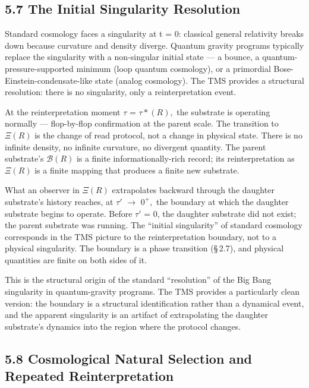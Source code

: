 \documentclass[11pt,oneside]{report}
\theoremstyle{definition}
\theoremstyle{remark}
\begin{document}
\subsection*{5.7 The Initial Singularity Resolution}

Standard cosmology faces a singularity at t = 0: classical general
relativity breaks down because curvature and density diverge. Quantum
gravity programs typically replace the singularity with a non-singular
initial state --- a bounce, a quantum-pressure-supported minimum (loop
quantum cosmology), or a primordial Bose-Einstein-condensate-like state
(analog cosmology). The TMS provides a structural resolution: there is
no singularity, only a reinterpretation event.

At the reinterpretation moment \ensuremath{\tau} = \ensuremath{\tau *(R),} the substrate is operating
normally --- flop-by-flop confirmation at the parent scale. The
transition to \ensuremath{\Xi (R)} is the change of read protocol, not a change in
physical state. There is no infinite density, no infinite curvature, no
divergent quantity. The parent substrate's \ensuremath{\mathcal{B}(R)} is a finite
informationally-rich record; its reinterpretation as \ensuremath{\Xi (R)} is a finite
mapping that produces a finite new substrate.

What an observer in \ensuremath{\Xi (R)} extrapolates backward through the daughter
substrate's history reaches, at \ensuremath{\tau '} \ensuremath{\to} \ensuremath{0^{+},} the boundary at which the
daughter substrate begins to operate. Before \ensuremath{\tau '} = 0, the daughter
substrate did not exist; the parent substrate was running. The ``initial
singularity'' of standard cosmology corresponds in the TMS picture to
the reinterpretation boundary, not to a physical singularity. The
boundary is a phase transition (\S\,2.7), and physical quantities are
finite on both sides of it.

This is the structural origin of the standard ``resolution'' of the Big
Bang singularity in quantum-gravity programs. The TMS provides a
particularly clean version: the boundary is a structural identification
rather than a dynamical event, and the apparent singularity is an
artifact of extrapolating the daughter substrate's dynamics into the
region where the protocol changes.

\subsection*{5.8 Cosmological Natural Selection and Repeated Reinterpretation}
\end{document}
